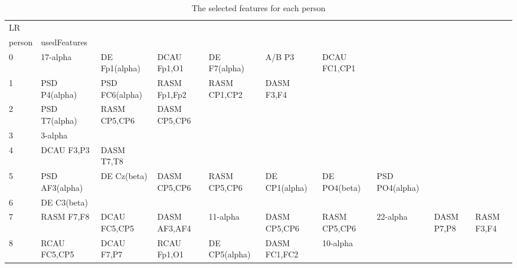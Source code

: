 \begin{landscape}
\begin{table}[]
\centering
\caption{The selected features for each person}
\begin{tabular}{l|llllllll}
LR       &                &                &                &                &                &                &                &                &               &              \\
person   & usedFeatures   &                &                &                &                &                &                &                &               &              \\
0        & 17-alpha       & DE Fp1(alpha)  & DCAU Fp1,O1    & DE F7(alpha)   & A/B P3         & DCAU FC1,CP1   &                &                &               &              \\
1        & PSD P4(alpha)  & PSD FC6(alpha) & RASM Fp1,Fp2   & RASM CP1,CP2   & DASM F3,F4     &                &                &                &               &              \\
2        & PSD T7(alpha)  & RASM CP5,CP6   & DASM CP5,CP6   &                &                &                &                &                &               &              \\
3        & 3-alpha        &                &                &                &                &                &                &                &               &              \\
4        & DCAU F3,P3     & DASM T7,T8     &                &                &                &                &                &                &               &              \\
5        & PSD AF3(alpha) & DE Cz(beta)    & DASM CP5,CP6   & RASM CP5,CP6   & DE CP1(alpha)  & DE PO4(beta)   & PSD PO4(alpha) &                &               &              \\
6        & DE C3(beta)    &                &                &                &                &                &                &                &               &              \\
7        & RASM F7,F8     & DCAU FC5,CP5   & DASM AF3,AF4   & 11-alpha       & DASM CP5,CP6   & RASM CP5,CP6   & 22-alpha       & DASM P7,P8     & RASM F3,F4    &              \\
8        & RCAU FC5,CP5   & DCAU F7,P7     & RCAU Fp1,O1    & DE CP5(alpha)  & DASM FC1,FC2   & 10-alpha       &                &                &               &              \\

\end{tabular}
\end{table}
\end{landscape}
